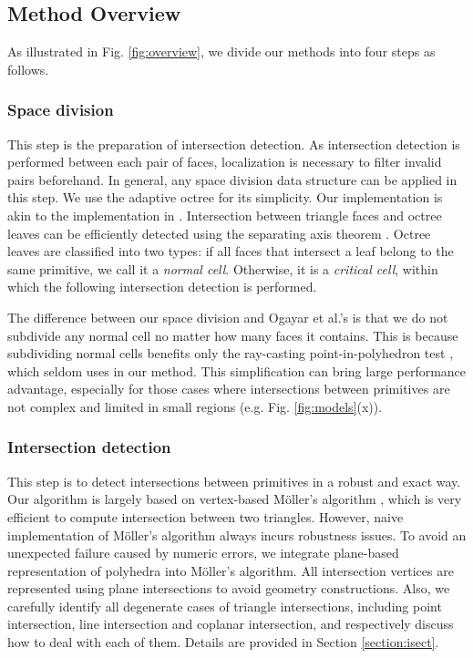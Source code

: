 \documentclass[10pt,journal,compsoc]{IEEEtran}
\begin{document}
\subsection{Method Overview}


As illustrated in Fig. \ref{fig:overview}, we divide our methods into four steps as follows.

\subsubsection{Space division}

This step is the preparation of intersection detection. As intersection detection is performed between each pair of faces, localization is necessary to filter invalid pairs beforehand. In general, any space division data structure can be applied in this step. We use the adaptive octree for its simplicity. Our implementation is akin to the implementation in \cite{ogayar2015deferred}. Intersection between triangle faces and octree leaves can be efficiently detected using the separating axis theorem \cite{gottschalk1996obbtree}. Octree leaves are classified into two types: if all faces that intersect a leaf belong to the same primitive, we call it a \emph{normal cell}. Otherwise, it is a \emph{critical cell}, within which the following intersection detection is performed.

The difference between our space division and Ogayar et al.'s is that we do not subdivide any normal cell no matter how many faces it contains. This is because subdividing normal cells benefits only the ray-casting point-in-polyhedron test  \cite{frisken2002simple}, which seldom uses in our method. This simplification can bring large performance advantage, especially for those cases where intersections between primitives are not complex and limited in small regions (e.g. Fig. \ref{fig:models}(x)).

\subsubsection{Intersection detection}

This step is to detect intersections between primitives in a robust and exact way. Our algorithm is largely based on vertex-based M\"{o}ller's algorithm \cite{moller1997fast}, which is very efficient to compute intersection between two triangles. However, naive implementation of M\"{o}ller's algorithm always incurs robustness issues. To avoid an unexpected failure caused by numeric errors, we integrate plane-based representation of polyhedra into M\"{o}ller's algorithm. All intersection vertices are represented using plane intersections to avoid geometry constructions. Also, we carefully identify all degenerate cases of triangle intersections, including point intersection, line intersection and coplanar intersection, and respectively discuss how to deal with each of them. Details are provided in Section \ref{section:isect}.
\end{document}
